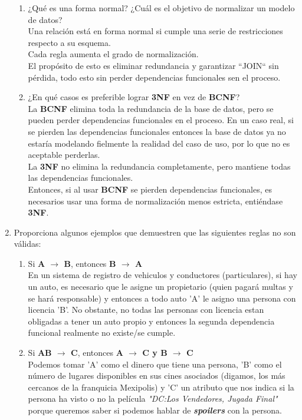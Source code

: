 \documentclass{article}
\begin{document}
\begin{enumerate}
\begin{enumerate}[label = \alph*.]
        \item ¿Qué es una forma normal? ¿Cuál es el objetivo de normalizar un modelo de datos? \\
        Una relación está en forma normal si cumple una serie
        de restricciones respecto a su esquema.\\
        Cada regla aumenta el grado de normalización.\\
        El propósito de esto es eliminar redundancia y 
        garantizar ``JOIN`` sin pérdida, todo esto sin perder
        dependencias funcionales sen el proceso.
        \item ¿En qué casos es preferible lograr \textbf{3NF} en vez de \textbf{BCNF}?\\
        La \textbf{BCNF} elimina toda la redundancia de la base
        de datos, pero se pueden perder dependencias funcionales
        en el proceso. En un caso real, si se pierden las
        dependencias funcionales entonces la base de datos ya no
        estaría modelando fielmente la realidad del caso de uso,
        por lo que no es aceptable perderlas.\\
        La \textbf{3NF} no elimina la redundancia completamente,
        pero mantiene todas las dependencias funcionales.\\
        Entonces, si al usar \textbf{BCNF} se pierden
        dependencias funcionales, es necesarios usar una forma
        de normalización menos estricta, entiéndase 
        \textbf{3NF}.
    \end{enumerate}

    \item
    Proporciona algunos ejemplos que demuestren que las siguientes reglas no son válidas:
    \begin{enumerate}
    	\item Si \textbf{A $\rightarrow$ B}, entonces  \textbf{B $\rightarrow$ A}\\
    	En un sistema de registro de vehiculos y conductores (particulares), si hay un auto, es necesario que le
    	asigne un propietario (quien pagará multas y se hará responsable) y entonces a todo auto 'A' le asigno una
    	persona con licencia 'B'. No obstante, no todas las personas con licencia estan obligadas a tener un auto 
    	propio y entonces la segunda dependencia funcional realmente no existe/se cumple.
    	
    	\item Si \textbf{AB $\rightarrow$ C}, entonces  \textbf{A $\rightarrow$ C y B $\rightarrow$ C}\\
    	Podemos tomar 'A' como el dinero que tiene una persona, 'B' como el número de lugares disponibles en
    	sus cines asociados (digamos, los más cercanos de la franquicia Mexipolis) y 'C' un atributo que nos
    	indica si la persona ha visto o no la película \textit{"DC:Los Vendedores, Jugada Final"} porque queremos
    	saber si podemos hablar de \textit{\textbf{spoilers}} con la persona.
    	

\end{enumerate}
\end{enumerate}
\end{document}
